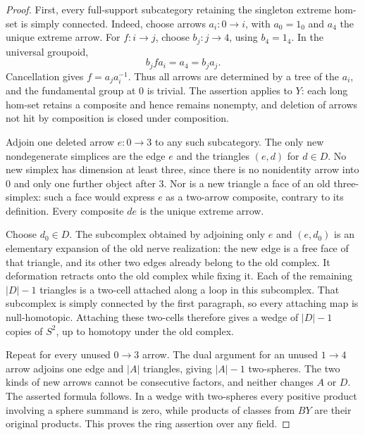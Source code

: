 \begin{proof}
First, every full-support subcategory retaining the
singleton extreme hom-set is simply connected. Indeed,
choose arrows $a_i:0\to i$, with $a_0=1_0$ and $a_4$
the unique extreme arrow. For $f:i\to j$, choose
$b_j:j\to4$, using $b_4=1_4$. In the universal groupoid,
\[
 b_j f a_i=a_4=b_j a_j.
\]
Cancellation gives $f=a_j a_i^{-1}$. Thus all arrows are
determined by a tree of the $a_i$, and the fundamental
group at $0$ is trivial. The assertion applies to $Y$:
each long hom-set retains a composite and hence remains
nonempty, and deletion of arrows not hit by composition
is closed under composition.

Adjoin one deleted arrow $e:0\to3$ to any such
subcategory. The only new nondegenerate simplices are
the edge $e$ and the triangles $(e,d)$ for $d\in D$.
No new simplex has dimension at least three, since
there is no nonidentity arrow into $0$ and only one
further object after $3$. Nor is a new triangle a face
of an old three-simplex: such a face would express
$e$ as a two-arrow composite, contrary to its definition.
Every composite $de$ is the unique extreme arrow.

Choose $d_0\in D$. The subcomplex obtained by adjoining
only $e$ and $(e,d_0)$ is an elementary expansion of
the old nerve realization: the new edge is a free
face of that triangle, and its other two edges already
belong to the old complex. It deformation retracts
onto the old complex while fixing it. Each of the
remaining $|D|-1$ triangles is a two-cell attached
along a loop in this subcomplex. That subcomplex is
simply connected by the first paragraph, so every
attaching map is null-homotopic. Attaching these
two-cells therefore gives a wedge of $|D|-1$ copies
of $S^2$, up to homotopy under the old complex.

Repeat for every unused $0\to3$ arrow. The dual
argument for an unused $1\to4$ arrow adjoins one
edge and $|A|$ triangles, giving $|A|-1$ two-spheres.
The two kinds of new arrows cannot be consecutive
factors, and neither changes $A$ or $D$. The asserted
formula follows. In a wedge with two-spheres every
positive product involving a sphere summand is zero,
while products of classes from $BY$ are their original
products. This proves the ring assertion over any field.
\end{proof}

